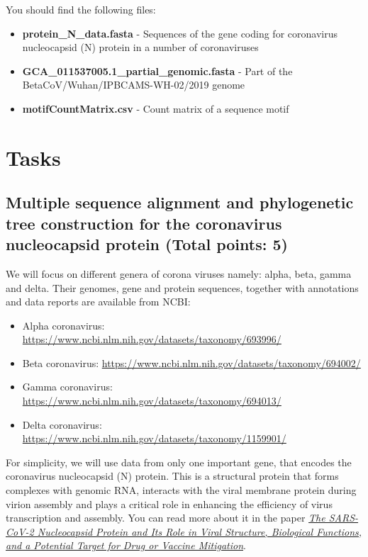 \documentclass[
  a4paper,
  DIV=11,
  numbers=noendperiod]{scrartcl}
\providecommand{\tightlist}{%
  \setlength{\itemsep}{0pt}\setlength{\parskip}{0pt}}\usepackage{longtable,booktabs,array}
\begin{document}
You should find the following files:

\begin{itemize}
\tightlist
\item
  \textbf{protein\_N\_data.fasta} - Sequences of the gene coding for
  coronavirus nucleocapsid (N) protein in a number of coronaviruses
\item
  \textbf{GCA\_011537005.1\_partial\_genomic.fasta} - Part of the
  BetaCoV/Wuhan/IPBCAMS-WH-02/2019 genome
\item
  \textbf{motifCountMatrix.csv} - Count matrix of a sequence motif
\end{itemize}

\hypertarget{tasks}{%
\section{Tasks}\label{tasks}}

\hypertarget{multiple-sequence-alignment-and-phylogenetic-tree-construction-for-the-coronavirus-nucleocapsid-protein-total-points-5}{%
\subsection{Multiple sequence alignment and phylogenetic tree
construction for the coronavirus nucleocapsid protein (Total points:
5)}\label{multiple-sequence-alignment-and-phylogenetic-tree-construction-for-the-coronavirus-nucleocapsid-protein-total-points-5}}

We will focus on different genera of corona viruses namely: alpha, beta,
gamma and delta. Their genomes, gene and protein sequences, together
with annotations and data reports are available from NCBI:

\begin{itemize}
\tightlist
\item
  Alpha coronavirus:
  \url{https://www.ncbi.nlm.nih.gov/datasets/taxonomy/693996/}
\item
  Beta coronavirus:
  \url{https://www.ncbi.nlm.nih.gov/datasets/taxonomy/694002/}
\item
  Gamma coronavirus:
  \url{https://www.ncbi.nlm.nih.gov/datasets/taxonomy/694013/}
\item
  Delta coronavirus:
  \url{https://www.ncbi.nlm.nih.gov/datasets/taxonomy/1159901/}
\end{itemize}

For simplicity, we will use data from only one important gene, that
encodes the coronavirus nucleocapsid (N) protein. This is a structural
protein that forms complexes with genomic RNA, interacts with the viral
membrane protein during virion assembly and plays a critical role in
enhancing the efficiency of virus transcription and assembly. You can
read more about it in the paper
\href{https://www.ncbi.nlm.nih.gov/pmc/articles/PMC8227405/}{\emph{The
SARS-CoV-2 Nucleocapsid Protein and Its Role in Viral Structure,
Biological Functions, and a Potential Target for Drug or Vaccine
Mitigation}}.
\end{document}
